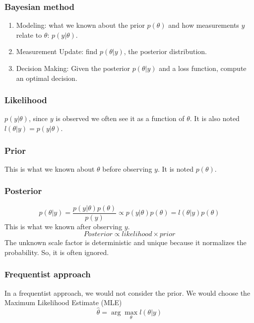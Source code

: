 \subsubsection{Bayesian method}
\begin{enumerate}
    \item Modeling: what we known about the prior $p(\theta)$ and how measurements $y$ relate to $\theta$: $p(y|\theta)$.
    \item Measurement Update: find $p(\theta|y)$, the posterior distribution.
    \item Decision Making: Given the posterior $p(\theta|y)$ and a loss function, compute an optimal decision.
\end{enumerate}

\subsubsection{Likelihood}
$p(y|\theta)$, since $y$ is observed we often see it as a function of $\theta$. It is also noted $l(\theta|y) = p(y|\theta)$.

\subsubsection{Prior} This is what we known about $\theta$ before observing $y$. It is noted $p(\theta)$.

\subsubsection{Posterior}
\begin{equation}
    p(\theta|y) = \frac{p(y|\theta)p(\theta)}{p(y)} \propto p(y|\theta)p(\theta) = l(\theta|y)p(\theta)
\end{equation}
This is what we known after observing $y$.
\begin{equation}
    Posterior \propto likelihood \times prior
\end{equation}
The unknown scale factor is deterministic and unique because it normalizes the probability. So, it is often ignored.

\subsubsection{Frequentist approach} In a frequentist approach, we would not consider the prior. We would choose the Maximum Likelihood Estimate (MLE)
\begin{equation}
    \hat{\theta} = \arg\max_{\theta} l(\theta|y)
\end{equation}

